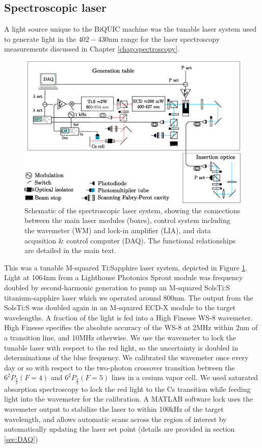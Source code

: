 	
	

\subsection*{Spectroscopic laser}
	A light source unique to the BiQUIC machine was the tunable laser system used to generate light in the $402-430$nm range for the laser spectroscopy measurements discussed  in Chapter \ref{chap:spectroscopy}.

	\begin{figure}
		\centering
		\includegraphics[width=\textwidth]{fig/apparatus/solstis_schematic_minim}
		\caption{Schematic of the spectroscopic laser system, showing the connections between the main laser modules (boxes), control system including the wavemeter (WM) and lock-in amplifier (LIA), and data acqusition \& control computer (DAQ). The functional relationships are detailed in the main text.}
		\label{fig:tunable_laser}
	\end{figure}
	
	

	This  was a tunable M-squared Ti:Sapphire laser system, depicted in Figure \ref{fig:tunable_laser}.
	Light at 1064nm from a Lighthouse Photonics Sprout module was frequency doubled by second-harmonic generation to pump an M-squared SolsTi:S titanium-sapphire laser which we operated around 800nm.
	The output from the SolsTi:S was doubled again in an M-squared ECD-X module to the target wavelengths.
	A fraction of the light is fed into a High Finesse WS-8 wavemeter.
	High Finesse specifies the absolute accuracy of the WS-8 at 2MHz within 2nm of a transition line, and 10MHz otherwise.
	We use the wavemeter to lock the tunable laser with respect to the red light, so the uncertainty is doubled in determinations of the blue frequency.
	We calibrated the wavemeter once every day or so with respect to the two-photon crossover transition between the $6^2P_{\frac{3}{2}} (F=4)$ and $6^2P_{\frac{3}{2}} (F=5)$ lines in a cesium vapor cell.
	We used saturated absorption spectroscopy to lock the red light to the Cs transition while feeding light into the wavemeter for the calibration.	
	A MATLAB software lock uses the wavemeter output to stabilize the laser to within 100kHz of the target wavelength, and allows automatic scans across the region of interest by automatically updating the laser set point (details are provided in section \ref{sec:DAQ})
	



